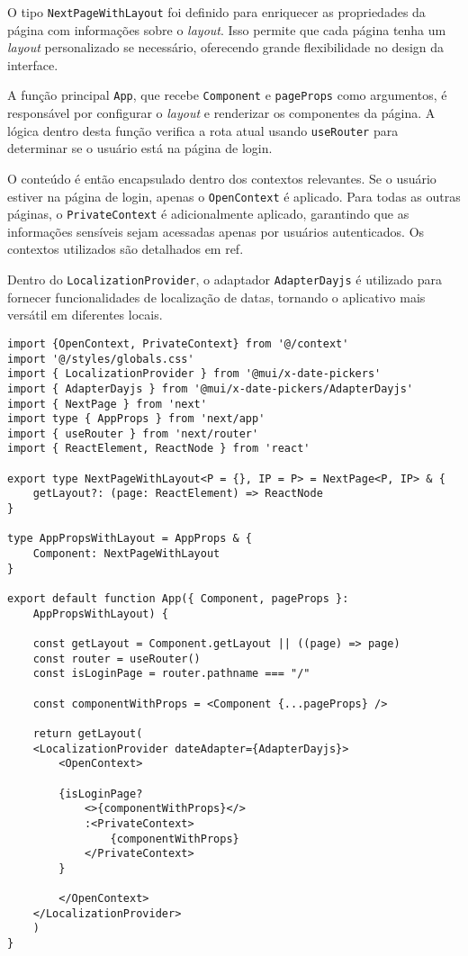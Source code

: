O tipo \texttt{NextPageWithLayout} foi definido para enriquecer as propriedades da página com informações sobre o \textit{layout}. Isso permite que cada página tenha um \textit{layout} personalizado se necessário, oferecendo grande flexibilidade no design da interface.

A função principal \texttt{App}, que recebe \texttt{Component} e \texttt{pageProps} como argumentos, é responsável por configurar o \textit{layout} e renderizar os componentes da página. A lógica dentro desta função verifica a rota atual usando \texttt{useRouter} \cite{nextjsUseRouter} para determinar se o usuário está na página de login.

O conteúdo é então encapsulado dentro dos contextos relevantes. Se o usuário estiver na página de login, apenas o \texttt{OpenContext} é aplicado. Para todas as outras páginas, o \texttt{PrivateContext} é adicionalmente aplicado, garantindo que as informações sensíveis sejam acessadas apenas por usuários autenticados. Os contextos utilizados são detalhados em ref. %

Dentro do \texttt{LocalizationProvider}, o adaptador \texttt{AdapterDayjs} é utilizado para fornecer funcionalidades de localização de datas, tornando o aplicativo mais versátil em diferentes locais.


\begin{verbatim}
import {OpenContext, PrivateContext} from '@/context'
import '@/styles/globals.css'
import { LocalizationProvider } from '@mui/x-date-pickers'
import { AdapterDayjs } from '@mui/x-date-pickers/AdapterDayjs'
import { NextPage } from 'next'
import type { AppProps } from 'next/app'
import { useRouter } from 'next/router'
import { ReactElement, ReactNode } from 'react'

export type NextPageWithLayout<P = {}, IP = P> = NextPage<P, IP> & {
    getLayout?: (page: ReactElement) => ReactNode
}

type AppPropsWithLayout = AppProps & {
    Component: NextPageWithLayout
}

export default function App({ Component, pageProps }: 
    AppPropsWithLayout) {

    const getLayout = Component.getLayout || ((page) => page)
    const router = useRouter()
    const isLoginPage = router.pathname === "/"

    const componentWithProps = <Component {...pageProps} /> 

    return getLayout(
    <LocalizationProvider dateAdapter={AdapterDayjs}>
        <OpenContext>

        {isLoginPage?
            <>{componentWithProps}</>
            :<PrivateContext>
                {componentWithProps}
            </PrivateContext>
        }

        </OpenContext>  
    </LocalizationProvider>
    )
}
\end{verbatim}

